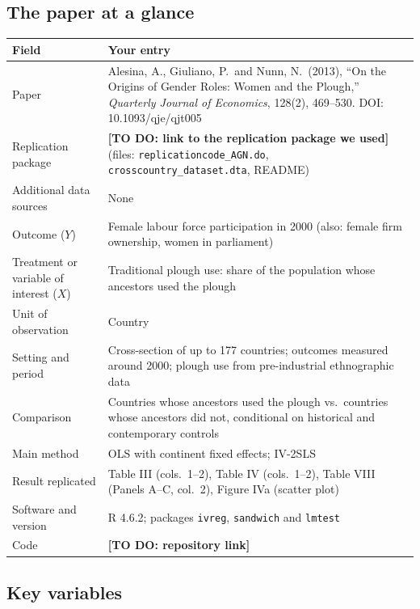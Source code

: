 \documentclass[12pt,a4paper]{article}
\renewcommand{\arraystretch}{1.25}
\begin{document}
\subsection{The paper at a glance}

{\renewcommand{\arraystretch}{1.4}%
\begin{tabularx}{\textwidth}{@{}>{\raggedright\arraybackslash}p{}L@{}}
\toprule
Field & Your entry \\
\midrule
Paper & Alesina, A., Giuliano, P.\ and Nunn, N.\ (2013), ``On the Origins of Gender Roles: Women and the Plough,'' \textit{Quarterly Journal of Economics}, 128(2), 469--530. DOI: 10.1093/qje/qjt005 \\
Replication package & \textbf{[TO DO: link to the replication package we used]} (files: \texttt{replicationcode\_AGN.do}, \texttt{crosscountry\_dataset.dta}, README) \\
Additional data sources & None \\
Outcome ($Y$) & Female labour force participation in 2000 (also: female firm ownership, women in parliament) \\
Treatment or variable of interest ($X$) & Traditional plough use: share of the population whose ancestors used the plough \\
Unit of observation & Country \\
Setting and period & Cross-section of up to 177 countries; outcomes measured around 2000; plough use from pre-industrial ethnographic data \\
Comparison & Countries whose ancestors used the plough vs.\ countries whose ancestors did not, conditional on historical and contemporary controls \\
Main method & OLS with continent fixed effects; IV-2SLS \\
Result replicated & Table III (cols.\ 1--2), Table IV (cols.\ 1--2), Table VIII (Panels A--C, col.\ 2), Figure IVa (scatter plot) \\
Software and version & R 4.6.2; packages \texttt{ivreg}, \texttt{sandwich} and \texttt{lmtest} \\
Code & \textbf{[TO DO: repository link]} \\
\bottomrule
\end{tabularx}}

\subsection{Key variables}
\end{document}
